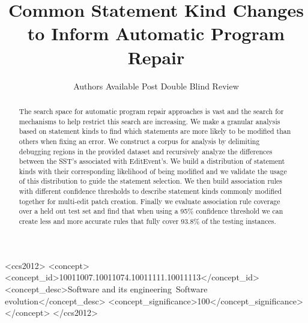 \documentclass[sigconf]{acmart}
\begin{document}
\title{Common Statement Kind Changes to Inform Automatic Program Repair}




\author{Authors Available Post Double Blind Review}
\affiliation{%
  \institution{~~}
  \city{~~}
  \state{~~}
  \state{~~}
  \state{~~}
  \postcode{~~}
}
\email{  }





\begin{abstract}
The search space for automatic program repair approaches 
is vast and the search for mechanisms to help restrict this 
search are increasing.
We make a granular analysis based on statement kinds
to find which statements are more likely to be modified than others
when fixing an error.
We construct a corpus for analysis by 
delimiting debugging regions in the provided dataset and 
recursively analyze the
differences between the SST's associated with EditEvent's. 
We build a distribution of statement kinds with their corresponding
likelihood of being modified and we validate the usage of this 
distribution to guide the statement selection.
We then build association rules with different
confidence thresholds to describe statement kinds commonly modified
together for multi-edit patch creation. Finally
we evaluate association rule coverage over a held out test set
and find that when using a 95\% confidence threshold we
can create less and more accurate rules that fully cover 93.8\% of the testing instances.

\end{abstract}

%
%
\begin{CCSXML}
<ccs2012>
<concept>
<concept_id>10011007.10011074.10011111.10011113</concept_id>
<concept_desc>Software and its engineering~Software evolution</concept_desc>
<concept_significance>100</concept_significance>
</concept>
</ccs2012>
\end{CCSXML}
\end{document}
